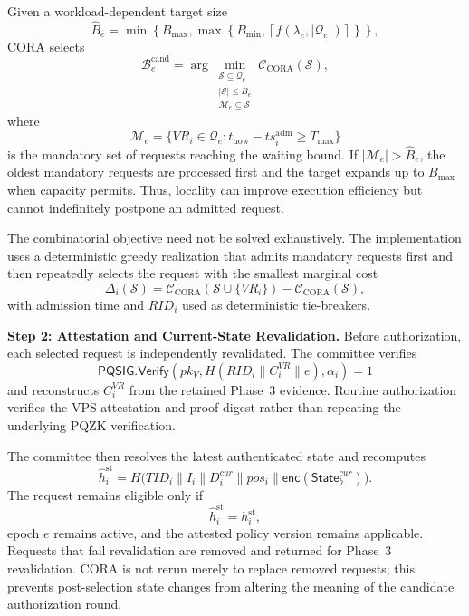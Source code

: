 \documentclass[lettersize,journal]{IEEEtran}
\begin{document}
Given a workload-dependent target size
\begin{equation}
\widehat{B}_e
=
\min\!\left\{
B_{\max},
\max\!\left\{
B_{\min},
\left\lceil
f(\lambda_e,|\mathcal{Q}_e|)
\right\rceil
\right\}
\right\},
\end{equation}
CORA selects
\begin{equation}
\mathcal{B}_e^{\mathrm{cand}}
=
\arg\min_{\substack{
\mathcal{S}\subseteq\mathcal{Q}_e\\
|\mathcal{S}|\leq\widehat{B}_e\\
\mathcal{M}_e\subseteq\mathcal{S}
}}
\mathcal{C}_{\mathrm{CORA}}(\mathcal{S}),
\end{equation}
where
\begin{equation}
\mathcal{M}_e=
\{VR_i\in\mathcal{Q}_e:
t_{\mathrm{now}}-ts_i^{\mathrm{adm}}\geq T_{\max}\}
\end{equation}
is the mandatory set of requests reaching the waiting bound. If
$|\mathcal{M}_e|>\widehat{B}_e$, the oldest mandatory requests are
processed first and the target expands up to $B_{\max}$ when capacity
permits. Thus, locality can improve execution efficiency but cannot
indefinitely postpone an admitted request.

The combinatorial objective need not be solved exhaustively. The
implementation uses a deterministic greedy realization that admits
mandatory requests first and then repeatedly selects the request with
the smallest marginal cost
\begin{equation}
\Delta_i(\mathcal{S})
=
\mathcal{C}_{\mathrm{CORA}}
(\mathcal{S}\cup\{VR_i\})
-
\mathcal{C}_{\mathrm{CORA}}(\mathcal{S}),
\end{equation}
with admission time and $RID_i$ used as deterministic tie-breakers.

\medskip
\noindent\textbf{Step 2: Attestation and Current-State Revalidation.}
Before authorization, each selected request is independently
revalidated. The committee verifies
\begin{equation}
\mathsf{PQSIG.Verify}
\left(
pk_V,
H(RID_i\parallel C_i^{VR}\parallel e),
\alpha_i
\right)=1
\end{equation}
and reconstructs $C_i^{VR}$ from the retained Phase~3 evidence.
Routine authorization verifies the VPS attestation and proof digest
rather than repeating the underlying PQZK verification.

The committee then resolves the latest authenticated state and
recomputes
\begin{equation}
\widehat{h}_i^{\mathrm{st}}
=
H\big(
TID_i\parallel I_i\parallel D_i^{cur}\parallel pos_i
\parallel
\mathsf{enc}(\mathsf{State}_b^{cur})
\big).
\end{equation}
The request remains eligible only if
\begin{equation}
\widehat{h}_i^{\mathrm{st}}
=
h_i^{\mathrm{st}},
\end{equation}
epoch $e$ remains active, and the attested policy version remains
applicable. Requests that fail revalidation are removed and returned
for Phase~3 revalidation. CORA is not rerun merely to replace removed
requests; this prevents post-selection state changes from altering the
meaning of the candidate authorization round.
\end{document}
